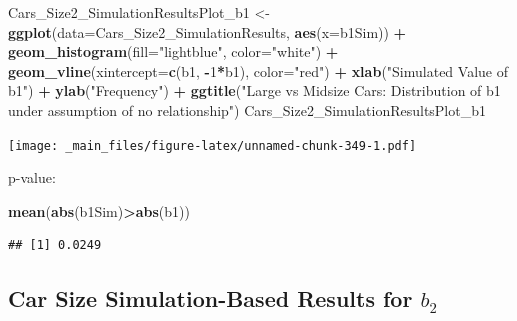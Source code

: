 \documentclass[]{book}
\newenvironment{Shaded}{\begin{snugshade}}{\end{snugshade}}
\newcommand{\KeywordTok}[1]{\textcolor[rgb]{0.13,0.29,0.53}{\textbf{#1}}}
\newcommand{\DataTypeTok}[1]{\textcolor[rgb]{0.13,0.29,0.53}{#1}}
\newcommand{\DecValTok}[1]{\textcolor[rgb]{0.00,0.00,0.81}{#1}}
\newcommand{\StringTok}[1]{\textcolor[rgb]{0.31,0.60,0.02}{#1}}
\newcommand{\OperatorTok}[1]{\textcolor[rgb]{0.81,0.36,0.00}{\textbf{#1}}}
\newcommand{\NormalTok}[1]{#1}
\begin{document}
\begin{Shaded}
\begin{Highlighting}[]
\NormalTok{Cars_Size2_SimulationResultsPlot_b1 <-}\StringTok{ }\KeywordTok{ggplot}\NormalTok{(}\DataTypeTok{data=}\NormalTok{Cars_Size2_SimulationResults, }\KeywordTok{aes}\NormalTok{(}\DataTypeTok{x=}\NormalTok{b1Sim)) }\OperatorTok{+}\StringTok{ }
\StringTok{  }\KeywordTok{geom_histogram}\NormalTok{(}\DataTypeTok{fill=}\StringTok{"lightblue"}\NormalTok{, }\DataTypeTok{color=}\StringTok{"white"}\NormalTok{) }\OperatorTok{+}\StringTok{ }
\StringTok{  }\KeywordTok{geom_vline}\NormalTok{(}\DataTypeTok{xintercept=}\KeywordTok{c}\NormalTok{(b1, }\OperatorTok{-}\DecValTok{1}\OperatorTok{*}\NormalTok{b1), }\DataTypeTok{color=}\StringTok{"red"}\NormalTok{) }\OperatorTok{+}\StringTok{ }
\StringTok{  }\KeywordTok{xlab}\NormalTok{(}\StringTok{"Simulated Value of b1"}\NormalTok{) }\OperatorTok{+}\StringTok{ }\KeywordTok{ylab}\NormalTok{(}\StringTok{"Frequency"}\NormalTok{) }\OperatorTok{+}\StringTok{ }
\StringTok{  }\KeywordTok{ggtitle}\NormalTok{(}\StringTok{"Large vs Midsize Cars: Distribution of b1 under assumption of no relationship"}\NormalTok{)}
\NormalTok{Cars_Size2_SimulationResultsPlot_b1}
\end{Highlighting}
\end{Shaded}

\texttt{[image: \_main\_files/figure-latex/unnamed-chunk-349-1.pdf]}

p-value:

\begin{Shaded}
\begin{Highlighting}[]
\KeywordTok{mean}\NormalTok{(}\KeywordTok{abs}\NormalTok{(b1Sim)}\OperatorTok{>}\KeywordTok{abs}\NormalTok{(b1))}
\end{Highlighting}
\end{Shaded}

\begin{verbatim}
## [1] 0.0249
\end{verbatim}

\subsection{\texorpdfstring{Car Size Simulation-Based Results for
\(b_2\)}{Car Size Simulation-Based Results for b\_2}}\label{car-size-simulation-based-results-for-b_2}
\end{document}
